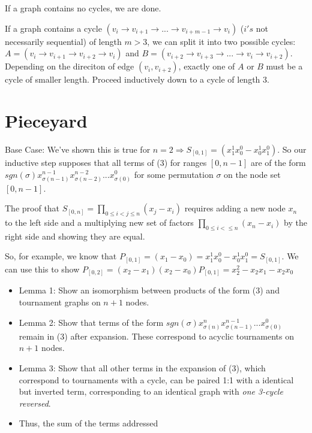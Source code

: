 \documentclass[11pt, oneside]{article} 	%
\begin{document}
If a graph contains no cycles, we are done.

If a graph contains a cycle $(v_i \rightarrow v_{i+1} \rightarrow  ...  \rightarrow v_{i+m-1} \rightarrow  v_i)$ ($i's$ not necessarily sequential) of length $m > 3$, we can split it into two possible cycles: $A = (v_i \rightarrow  v_{i+1} \rightarrow v_{i+2} \rightarrow  v_i)$ and $B = (v_{i+2} \rightarrow  v_{i+3} \rightarrow  ... \rightarrow v_{i} \rightarrow v_{i+2} )$.  Depending on the direciton of edge $(v_{i}, v_{i+2})$, exactly one of $A$ or $B$ must be a cycle of smaller length.  Proceed inductively down to a cycle of length 3.






\section{Pieceyard}


 
Base Case: We've shown this is true for  $n=2 \Rightarrow S_{[0,1]} = (x_1^1x_0^0 - x_0^1x_1^0)$.  
So our inductive step supposes that all terms of (3) for ranges $[0, n-1]$ are of the form  $sgn(\sigma) x_{\sigma(n-1)}^{n-1} x_{\sigma(n-2)}^{n-2} ... x_{\sigma(0)}^{0} $ for some permutation $\sigma$ on the node set $[0, n-1]$.  

The proof that  $S_[0,n] = \prod_{0 \leq i < j \leq n} (x_j - x_i)$ requires adding a new node $x_n$ to the left side and a multiplying new set of factors $\prod_{0 \leq i < \leq n} (x_n - x_i)$ by the right side and showing they are equal.

So, for example, we know that $P_{[0,1]} = (x_1 - x_0) = x_1^1x_0^0 - x_0^1x_1^0 = S_{[0,1]}$.
We can use this to show $P_{[0,2]} = (x_2 - x_1)(x_2-x_0)P_{[0,1]} = x_2^2-x_2x_1-x_2x_0$

\begin{itemize}
\item Lemma 1: Show an isomorphism between products of the form (3) and tournament graphs on $n+1$ nodes.
\item Lemma 2: Show that terms of the form $sgn(\sigma) x_{\sigma(n)}^n x_{\sigma(n-1)}^{n-1} ... x_{\sigma(0)}^{0} $ remain in (3) after expansion.  These correspond to acyclic tournaments on $n+1$ nodes.
\item Lemma 3: Show that all other terms in the expansion of (3), which correspond to tournaments with a cycle, can be paired 1:1 with a identical but inverted term, corresponding to an identical graph with \emph{one 3-cycle reversed}.
\item Thus, the sum of the terms addressed 
\end{itemize}
\end{document}
